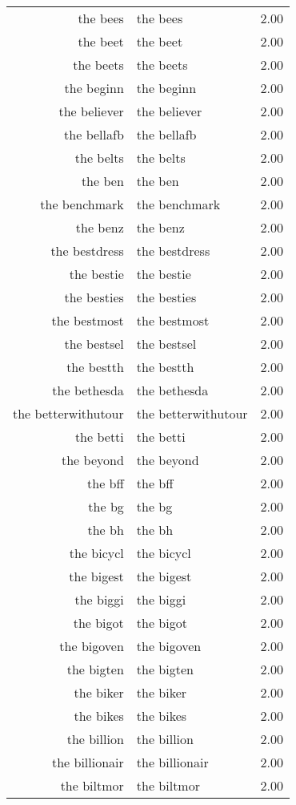 \begin{table}[ht]
\begin{tabular}{rlr}
  the bees & the bees & 2.00 \\ 
  the beet & the beet & 2.00 \\ 
  the beets & the beets & 2.00 \\ 
  the beginn & the beginn & 2.00 \\ 
  the believer & the believer & 2.00 \\ 
  the bellafb & the bellafb & 2.00 \\ 
  the belts & the belts & 2.00 \\ 
  the ben & the ben & 2.00 \\ 
  the benchmark & the benchmark & 2.00 \\ 
  the benz & the benz & 2.00 \\ 
  the bestdress & the bestdress & 2.00 \\ 
  the bestie & the bestie & 2.00 \\ 
  the besties & the besties & 2.00 \\ 
  the bestmost & the bestmost & 2.00 \\ 
  the bestsel & the bestsel & 2.00 \\ 
  the bestth & the bestth & 2.00 \\ 
  the bethesda & the bethesda & 2.00 \\ 
  the betterwithutour & the betterwithutour & 2.00 \\ 
  the betti & the betti & 2.00 \\ 
  the beyond & the beyond & 2.00 \\ 
  the bff & the bff & 2.00 \\ 
  the bg & the bg & 2.00 \\ 
  the bh & the bh & 2.00 \\ 
  the bicycl & the bicycl & 2.00 \\ 
  the bigest & the bigest & 2.00 \\ 
  the biggi & the biggi & 2.00 \\ 
  the bigot & the bigot & 2.00 \\ 
  the bigoven & the bigoven & 2.00 \\ 
  the bigten & the bigten & 2.00 \\ 
  the biker & the biker & 2.00 \\ 
  the bikes & the bikes & 2.00 \\ 
  the billion & the billion & 2.00 \\ 
  the billionair & the billionair & 2.00 \\ 
  the biltmor & the biltmor & 2.00 \\ 

\end{tabular}
\end{table}
